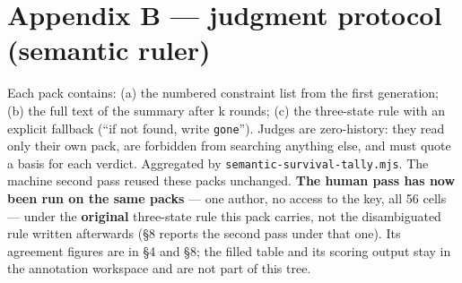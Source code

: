 \documentclass[
]{article}
\begin{document}
\section{Appendix B --- judgment protocol (semantic
ruler)}\label{appendix-b-judgment-protocol-semantic-ruler}

Each pack contains: (a) the numbered constraint list from the first
generation; (b) the full text of the summary after k rounds; (c) the
three-state rule with an explicit fallback (``if not found, write
\texttt{gone}''). Judges are zero-history: they read only their own
pack, are forbidden from searching anything else, and must quote a basis
for each verdict. Aggregated by \texttt{semantic-survival-tally.mjs}.
The machine second pass reused these packs unchanged. \textbf{The human
pass has now been run on the same packs} --- one author, no access to
the key, all 56 cells --- under the \textbf{original} three-state rule
this pack carries, not the disambiguated rule written afterwards (§8
reports the second pass under that one). Its agreement figures are in §4
and §8; the filled table and its scoring output stay in the annotation
workspace and are not part of this tree.
\end{document}
